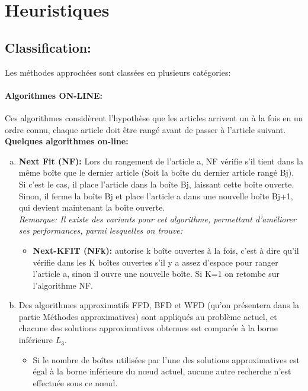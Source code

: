 \documentclass[class=report, crop=false]{standalone}
\begin{document}
        \section{Heuristiques}
        \subsection{Classification:}
        Les méthodes approchées  sont classées en plusieurs catégories:
        \paragraph{Algorithmes ON-LINE:} Ces algorithmes considèrent l’hypothèse que les articles arrivent un à la fois en un ordre connu, chaque article doit être rangé avant de passer à l’article suivant.
        \\
        \textbf{Quelques algorithmes on-line:}
         
        \begin{enumerate}[a.]
            \item \textbf{Next Fit (NF):} Lors du rangement de l’article a, NF vérifie s'il tient dans la même boîte que le dernier article (Soit la boîte du dernier article rangé Bj). Si c’est le cas, il place l’article dans la boîte Bj, laissant cette boîte ouverte. Sinon, il ferme la boîte Bj et place l’article a dans une nouvelle boîte Bj+1, qui devient maintenant la boîte ouverte.
            \\ \emph{Remarque: Il existe des variants pour cet algorithme, permettant d’améliorer ses performances, parmi lesquelles on trouve: } 
                \begin{itemize}
                    \item \textbf{Next-KFIT (NFk):} autorise k boîte ouvertes à la fois, c’est à dire qu’il vérifie dans les K boîtes ouvertes s’il y a assez d’espace pour ranger l’article a, sinon il ouvre une nouvelle boîte. Si K=1 on retombe sur l’algorithme NF.
                \end{itemize}
            \item Des algorithmes approximatifs FFD, BFD et WFD (qu’on présentera dans la partie Méthodes approximatives) sont appliqués au problème actuel, et chacune des solutions approximatives obtenues est comparée à la borne inférieure \(L_3\).
                \begin{itemize}
                    \item Si le nombre de boîtes utilisées par l'une des solutions approximatives est égal à la borne inférieure du nœud actuel, aucune autre recherche n'est effectuée sous ce nœud. 
                \end{itemize}
        \end{enumerate}
\end{document}
